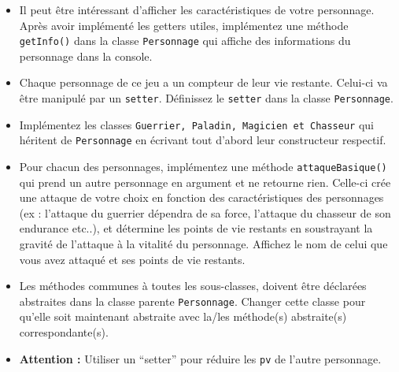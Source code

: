 \begin{Exercice}[15 minutes]
\begin{itemize}
        \item Il peut être intéressant d’afficher les caractéristiques de votre personnage. Après avoir implémenté les getters utiles, implémentez une méthode \lstinline{getInfo()} dans la classe \lstinline{Personnage} qui affiche des informations du personnage dans la console.
        
        \item Chaque personnage de ce jeu a un compteur de leur vie restante. Celui-ci va être manipulé par un \lstinline{setter}. Définissez le \lstinline{setter} dans la classe \lstinline{Personnage}.
        \item Implémentez les classes \lstinline{Guerrier, Paladin, Magicien et Chasseur} qui héritent de \lstinline{Personnage} en écrivant tout d’abord leur constructeur respectif. 
        
        
    
        \item Pour chacun des personnages, implémentez une méthode \lstinline{attaqueBasique()} qui prend un autre personnage en argument et ne retourne rien. Celle-ci crée une attaque de votre choix en fonction des caractéristiques des personnages (ex : l’attaque du guerrier dépendra de sa force, l’attaque du chasseur de son endurance etc..), et détermine les points de vie restants en soustrayant la gravité de l'attaque à la vitalité du personnage. Affichez le nom de celui que vous avez attaqué et ses points de vie restants.
        \item Les méthodes communes à toutes les sous-classes, doivent être déclarées abstraites dans la classe parente \lstinline{Personnage}. Changer cette classe pour qu'elle soit maintenant abstraite avec la/les méthode(s) abstraite(s) correspondante(s).
        \item \textbf{Attention :} Utiliser un ``setter'' pour réduire les \lstinline{pv} de l’autre personnage.
        
        
    \end{itemize}
    
    \begin{solution}
        
    \end{solution}
    \begin{solution}
        
    \end{solution}
    

\end{Exercice}
